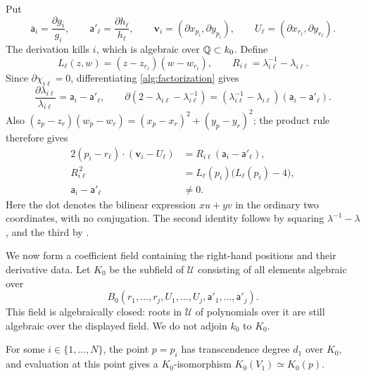 Put
\[
 \mathsf a_i=\frac{\partial g_i}{g_i},\qquad
 \mathsf a'_\ell=\frac{\partial h_\ell}{h_\ell},\qquad
 \mathbf v_i=(\partial x_{p_i},\partial y_{p_i}),\qquad
 U_\ell=(\partial x_{r_\ell},\partial y_{r_\ell}).
\]
The derivation kills \(i\), which is algebraic over \(\mathbb Q\subset k_0\).
Define
\[
 L_\ell(z,w)=(z-z_{r_\ell})(w-w_{r_\ell}),
 \qquad R_{i\ell}=\lambda_{i\ell}^{-1}-\lambda_{i\ell}.
\]
Since \(\partial\chi_{i\ell}=0\), differentiating
\eqref{alg:factorization} gives
\[
 \frac{\partial\lambda_{i\ell}}{\lambda_{i\ell}}=\mathsf a_i-\mathsf a'_\ell,\qquad
 \partial(2-\lambda_{i\ell}-\lambda_{i\ell}^{-1})
   =(\lambda_{i\ell}^{-1}-\lambda_{i\ell})(\mathsf a_i-\mathsf a'_\ell).
\]
Also \((z_p-z_r)(w_p-w_r)=(x_p-x_r)^2+(y_p-y_r)^2\);
the product rule therefore gives
\begin{align}
 2(p_i-r_\ell)\cdot(\mathbf v_i-U_\ell)
       &=R_{i\ell}(\mathsf a_i-\mathsf a'_\ell),
          \label{alg:differential}\\
 R_{i\ell}^{\,2}
       &=L_\ell(p_i)\bigl(L_\ell(p_i)-4\bigr),
          \label{alg:radicand}\\
 \mathsf a_i-\mathsf a'_\ell&\ne0.
          \label{alg:nonzero-derivative}
\end{align}
Here the dot denotes the bilinear expression \(xu+yv\) in the ordinary
two coordinates, with no conjugation. The second identity follows by
squaring \(\lambda^{-1}-\lambda\), and the third by
.

We now form a coefficient field containing the right-hand positions and
their derivative data. Let \(K_0\) be the subfield of \(\mathcal U\)
consisting of all elements algebraic over
\[
 B_0(r_1,\ldots,r_j,U_1,\ldots,U_j,\mathsf a'_1,\ldots,\mathsf a'_j).
\]
This field is algebraically closed: roots in \(\mathcal U\) of
polynomials over it are still algebraic over the displayed field.
We do not adjoin \(k_0\) to \(K_0\).

\begin{lemma}\label{alg:surviving-point}
For some \(i\in\{1,\ldots,N\}\), the point \(p=p_i\) has
transcendence degree \(d_1\) over \(K_0\), and evaluation at this
point gives a \(K_0\)-isomorphism \(K_0(V_1)\simeq K_0(p)\).
\end{lemma}

